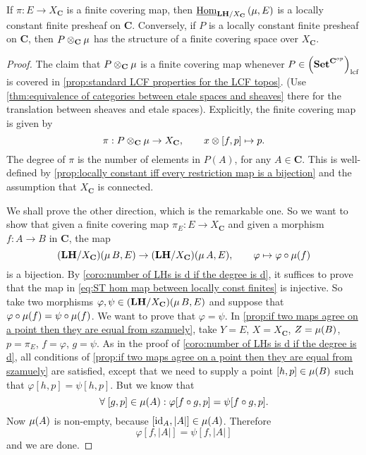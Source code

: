 \begin{theorem*}
\label{thm:equivalence of categories}
If $\pi : E \to X_{\mathbf{C}}$ is a finite covering map, then $\underline{\operatorname{Hom}}_{\mathbf{LH}/X_{\mathbf{C}}}\left(\operatorname{\mu}, E \right)$ is a locally constant finite presheaf on $\mathbf{C}$. Conversely, if $P$ is a locally constant finite presheaf on $\mathbf{C}$, then $P \otimes_{\mathbf{C}} \operatorname{\mu}$ has the structure of a finite covering space over $X_{\mathbf{C}}$.
\end{theorem*}
\begin{proof}
The claim that $P \otimes_{\mathbf{C}} \operatorname{\mu}$ is a finite covering map whenever $P \in \left(\mathbf{Set}^{\mathbf{C}^{op}}\right)_{\operatorname{lcf}}$ is covered in \cref{prop:standard LCF properties for the LCF topos}. (Use \cref{thm:equivalence of categories between etale spaces and sheaves} there for the translation between sheaves and etale spaces). Explicitly, the finite covering map is given by
\[ \pi : P \otimes_{\mathbf{C}} \operatorname{\mu} \to X_{\mathbf{C}}, \qquad x \otimes [f,p] \mapsto p. \]
The degree of $\pi$ is the number of elements in $P(A)$, for any $A \in \mathbf{C}$. This is well-defined by \cref{prop:locally constant iff every restriction map is a bijection} and the assumption that $X_{\mathbf{C}}$ is connected.

We shall prove the other direction, which is the remarkable one. So we want to show that given a finite covering map $\pi_E : E \to X_\mathbf{C}$ and given a morphism $f : A \to B$ in $\mathbf{C}$, the map
\begin{equation}
\label{eq:ST hom map between locally const finites}
(\mathbf{LH}/X_\mathbf{C})(\operatorname{\mu} B, E) \to (\mathbf{LH}/X_\mathbf{C})(\operatorname{\mu} A, E), \qquad \varphi \mapsto \varphi \circ \operatorname{\mu}(f)
\end{equation}
is a bijection. By \cref{coro:number of LHs is d if the degree is d}, it suffices to prove that the map in \cref{eq:ST hom map between locally const finites} is injective. So take two morphisms $\varphi, \psi \in (\mathbf{LH}/X_\mathbf{C})(\operatorname{\mu} B, E)$ and suppose that $ \varphi \circ \operatorname{\mu}(f) = \psi \circ \operatorname{\mu}(f)$. We want to prove that $\varphi = \psi$. In \cref{prop:if two maps agree on a point then they are equal from szamuely}, take $Y = E$, $X = X_{\mathbf{C}}$, $Z = \operatorname{\mu}(B)$, $p = \pi_E$, $f = \varphi$, $g = \psi$. As in the proof of \cref{coro:number of LHs is d if the degree is d}, all conditions of \cref{prop:if two maps agree on a point then they are equal from szamuely} are satisfied, except that we need to supply a point $[h,p] \in \operatorname{\mu}(B)$ such that $\varphi[h,p] = \psi[h,p]$. But we know that
\[ \forall \; [g,p] \in \operatorname{\mu}(A) : \varphi[f \circ g,p] = \psi[f \circ g, p]. \]
Now $\operatorname{\mu}(A)$ is non-empty, because $[\operatorname{id}_A, |A|] \in \operatorname{\mu}(A)$. Therefore
\[ \varphi[f, |A|] = \psi[f, |A|] \]
and we are done.
\end{proof}

